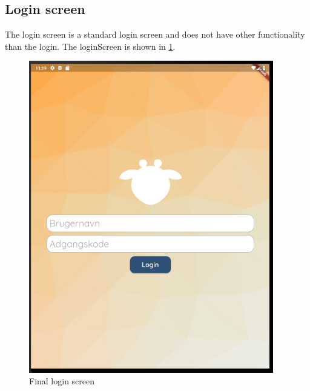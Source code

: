 \subsection{Login screen}
The login screen is a standard login screen and does not have other functionality than the login. The loginScreen is shown in \ref{fig:FinalLoginScreen}.
\begin{figure}[H]
    \begin{center}
        \includegraphics[width=0.95\textwidth]{figures/FinalScreen/loginScreen.png}
    \end{center}
    \caption{Final login screen}
    \label{fig:FinalLoginScreen}
\end{figure}

